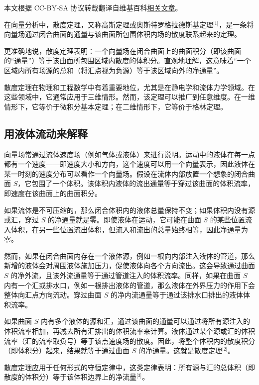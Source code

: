 
本文根据 CC-BY-SA 协议转载翻译自维基百科\href{https://en.wikipedia.org/wiki/Divergence_theorem}{相关文章}。

在向量分析中，散度定理，又称高斯定理或奥斯特罗格拉德斯基定理\(^\text{[1]}\)，是一条将向量场通过闭合曲面的通量与该曲面所包围体积内场的散度联系起来的定理。

更准确地说，散度定理表明：一个向量场在闭合曲面上的曲面积分（即该曲面的“通量”）等于该曲面所包围区域内散度的体积分。直观地理解，这意味着“一个区域内所有场源的总和（将汇点视为负源）等于该区域向外的净通量”。

散度定理在物理和工程数学中有着重要地位，尤其是在静电学和流体力学领域。在这些领域中，它通常应用于三维情形。然而，该定理可以推广到任意维度。在一维情形下，它等价于微积分基本定理；在二维情形下，它等价于格林定理。
\subsection{用液体流动来解释}
向量场常通过流体速度场（例如气体或液体）来进行说明。运动中的液体在每一点都有一个速度——即速度大小和方向，这个速度可以用一个向量表示，因此液体在某一时刻的速度分布可以看作一个向量场。假设在流体内部放置一个想象的闭合曲面 $S$，它包围了一个体积。该体积内液体的流出通量等于穿过该曲面的体积流率，即速度在该曲面上的曲面积分。

如果流体是不可压缩的，那么闭合体积内的液体总量保持不变；如果体积内没有源或汇，穿过 $S$ 的净通量就是零。即使液体在运动，它可能在曲面 $S$ 的某些位置流入体积，在另一些位置流出体积，但流入和流出的总量始终相等，因此净通量为零。

然而，如果在闭合曲面内存在一个液体源，例如一根向内部注入液体的管道，那么新增的液体会对周围液体施加压力，促使液体向各个方向流出。这会导致通过曲面 $S$ 的净外流，且该外流通量等于通过管道注入的体积流率。同样，如果在曲面 $S$ 内有一个汇或排水口，例如一根排出液体的管道，那么液体在外界压力的作用下会整体向汇点方向流动。穿过曲面 $S$ 的净内流通量等于通过该排水口排出的液体体积流率。

如果曲面 $S$ 内有多个液体的源和汇，通过该曲面的通量可以通过将所有源注入的体积流率相加，再减去所有汇排出的体积流率来计算。液体通过某个源或汇的体积流率（汇的流率取负号）等于该点速度场的散度。因此，将整个体积内的散度积分（即体积分）起来，结果就等于通过曲面 $S$ 的净通量。这就是散度定理\(^\text{[2]}\)。

散度定理应用于任何形式的守恒定律中，这类定律表明：所有源与汇的总体积（即散度的体积分）等于该体积边界上的净流量\(^\text{[3]}\)。
